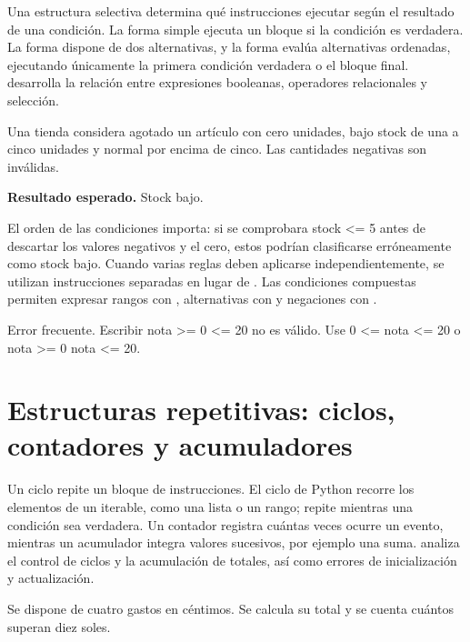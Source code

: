 Una estructura selectiva determina qué instrucciones ejecutar según el resultado de una condición. La forma simple  ejecuta un bloque si la condición es verdadera. La forma  dispone de dos alternativas, y la forma  evalúa alternativas ordenadas, ejecutando únicamente la primera condición verdadera o el bloque final. \textcite[cap.~4]{farrell2013} desarrolla la relación entre expresiones booleanas, operadores relacionales y selección.


Una tienda considera agotado un artículo con cero unidades, bajo stock de una a cinco unidades y normal por encima de cinco. Las cantidades negativas son inválidas.


\textbf{Resultado esperado.} Stock bajo.



El orden de las condiciones importa: si se comprobara stock <= 5 antes de descartar los valores negativos y el cero, estos podrían clasificarse erróneamente como stock bajo. Cuando varias reglas deben aplicarse independientemente, se utilizan instrucciones  separadas en lugar de . Las condiciones compuestas permiten expresar rangos con , alternativas con  y negaciones con .

Error frecuente. Escribir  nota >= 0  <= 20 no es válido. Use 0 <= nota <= 20 o nota >= 0  nota <= 20.

\section{Estructuras repetitivas: ciclos, contadores y acumuladores}

Un ciclo repite un bloque de instrucciones. El ciclo  de Python recorre los elementos de un iterable, como una lista o un rango;  repite mientras una condición sea verdadera. Un contador registra cuántas veces ocurre un evento, mientras un acumulador integra valores sucesivos, por ejemplo una suma. \textcite[cap.~5]{farrell2013} analiza el control de ciclos y la acumulación de totales, así como errores de inicialización y actualización.


Se dispone de cuatro gastos en céntimos. Se calcula su total y se cuenta cuántos superan diez soles.

